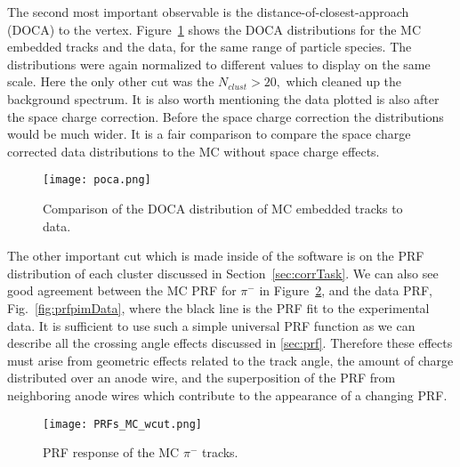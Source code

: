 The second most important observable is the distance-of-closest-approach (DOCA) to the vertex. Figure~\ref{fig:pocacomp} shows the DOCA distributions for the MC embedded tracks and the data, for the same range of particle species. The distributions were again normalized to different values to display on the same scale. Here the only other cut was the $N_{clust} > 20,$ which cleaned up the background spectrum. It is also worth mentioning the data plotted is also after the space charge correction. Before the space charge correction the distributions would be much wider. It is a fair comparison to compare the space charge corrected data distributions to the MC without space charge effects.  

\begin{figure}[!hbt]
\texttt{[image: poca.png]}
\caption{Comparison of the DOCA distribution of MC embedded tracks to data.}
\label{fig:pocacomp}
\end{figure}


The other important cut which is made inside of the software is on the PRF distribution of each cluster discussed in Section~\ref{sec:corrTask}. We can also see good agreement between the MC PRF for $\pi^-$ in Figure~\ref{fig:prfpimMC}, and the data PRF, Fig.~\ref{fig:prfpimData}, where the black line is the PRF fit to the experimental data. It is sufficient to use such a simple universal PRF function as we can describe all the crossing angle effects discussed in \ref{sec:prf}. Therefore these effects must arise from geometric effects related to the track angle, the amount of charge distributed over an anode wire, and the superposition of the PRF from neighboring anode wires which contribute to the appearance of a changing PRF.

\begin{figure}[!htb]
         \centering
         \texttt{[image: PRFs\_MC\_wcut.png]}
         \caption{PRF response of the MC $\pi^-$ tracks.}
         \label{fig:prfpimMC}
\end{figure}





